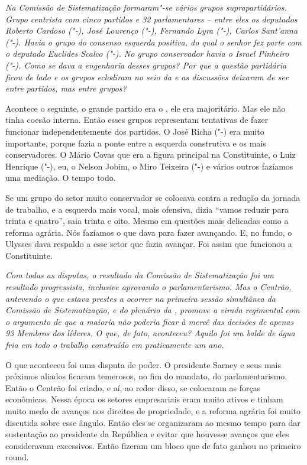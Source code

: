 \medskip

\noindent\emph{Na Comissão de Sistematização formaram"-se vários grupos
suprapartidários. Grupo centrista com cinco partidos e 32 parlamentares
-- entre eles os deputados Roberto Cardoso ("-), José
Lourenço ("-), Fernando Lyra ("-), Carlos Sant'anna ("-).
Havia o grupo do consenso esquerda positiva, do qual o senhor fez parte
com o deputado Euclides Scalco ("-). No grupo conservador havia o
Israel Pinheiro ("-). Como se dava a engenharia desses grupos? Por
que a questão partidária ficou de lado e os grupos eclodiram no seio da
 e as discussões deixaram de ser entre partidos, mas entre grupos?}

Acontece o seguinte, o grande partido era o , ele era
majoritário. Mas ele não tinha coesão interna. Então esses grupos
representam tentativas de fazer funcionar independentemente dos
partidos. O José Richa ("-) era muito importante, porque fazia a
ponte entre a esquerda construtiva e os mais conservadores. O Mário
Covas que era a figura principal na Constituinte, o Luiz Henrique
("-), eu, o Nelson Jobim, o Miro Teixeira ("-) e vários outros
fazíamos uma mediação. O tempo todo.

Se um grupo do setor muito conservador se colocava contra a redução da
jornada de trabalho, e a esquerda mais vocal, mais ofensiva, dizia
``vamos reduzir para trinta e quatro'', saia trinta e oito. Mesmo em
questões mais delicadas como a reforma agrária. Nós fazíamos o que dava
para fazer avançando. E, no fundo, o Ulysses dava respaldo a esse setor
que fazia avançar. Foi assim que funcionou a Constituinte.

\medskip

\noindent\emph{Com todas as disputas, o resultado da Comissão de Sistematização
foi um resultado progressista, inclusive aprovando o parlamentarismo.
Mas o Centrão, antevendo o que estava prestes a ocorrer na primeira
sessão simultânea da Comissão de Sistematização, e do plenário da ,
promove a virada regimental com o argumento de que a maioria não poderia
ficar à mercê das decisões de apenas 93 Membros dos líderes. O que, de
fato, aconteceu? Aquilo foi um balde de água fria em todo o trabalho
construído em praticamente um ano.}

O que aconteceu foi uma disputa de poder. O presidente
Sarney e seus mais próximos aliados ficaram temerosos, no fim do
mandato, do parlamentarismo. Então o Centrão foi criado, e aí, ao redor
disso, se colocaram as forças econômicas. Nessa época os setores
empresariais eram muito ativos e tinham muito medo de avanços nos
direitos de propriedade, e a reforma agrária foi muito discutida sobre
esse ângulo. Então eles se organizaram ao mesmo tempo para dar
sustentação ao presidente da República e evitar que houvesse avanços que
eles consideravam excessivos. Então fizeram um bloco que de fato ganhou
no primeiro round.

